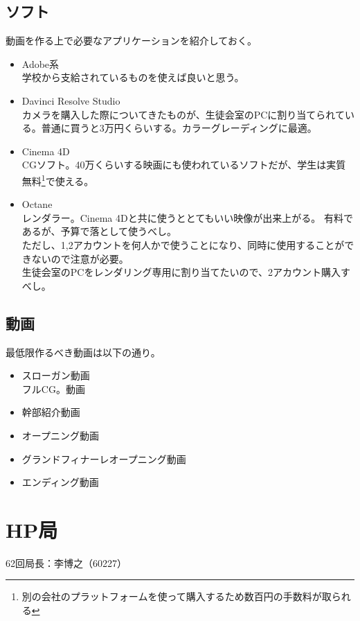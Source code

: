 \documentclass[dvipdfmx,jb5]{jarticle}
\begin{document}
\subsection{ソフト}
 動画を作る上で必要なアプリケーションを紹介しておく。
 \begin{itemize}
  \item Adobe系\\
  学校から支給されているものを使えば良いと思う。
  \item Davinci Resolve Studio\\
  カメラを購入した際についてきたものが、生徒会室のPCに割り当てられている。普通に買うと3万円くらいする。カラーグレーディングに最適。
  \item Cinema 4D\\
  CGソフト。40万くらいする映画にも使われているソフトだが、学生は実質無料\footnote{別の会社のプラットフォームを使って購入するため数百円の手数料が取られる}で使える。
  \item Octane\\
  レンダラー。Cinema 4Dと共に使うととてもいい映像が出来上がる。
  有料であるが、予算で落として使うべし。\\ただし、1,2アカウントを何人かで使うことになり、同時に使用することができないので注意が必要。\\生徒会室のPCをレンダリング専用に割り当てたいので、2アカウント購入すべし。
 \end{itemize}
\subsection{動画}
最低限作るべき動画は以下の通り。
 \begin{itemize}
  \item スローガン動画\\
  フルCG。動画
  \item 幹部紹介動画
  \item オープニング動画
  \item グランドフィナーレオープニング動画
  \item エンディング動画
 \end{itemize}
 
 \section{HP局}
 62回局長：李博之（60227）
\end{document}
